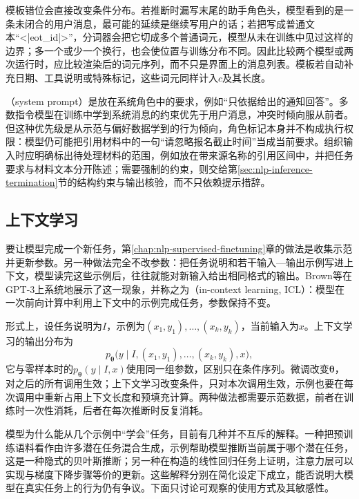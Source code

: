 模板错位会直接改变条件分布。若推断时漏写末尾的助手角色头，模型看到的是一条未闭合的用户消息，最可能的延续是继续写用户的话；若把写成普通文本“<|eot\_id|>”，分词器会把它切成多个普通词元，模型从未在训练中见过这样的边界；多一个或少一个换行，也会使位置与训练分布不同。因此比较两个模型或两次运行时，应比较渲染后的词元序列，而不只是界面上的消息列表。模板若自动补充日期、工具说明或特殊标记，这些词元同样计入$c$及其长度。

（system prompt）是放在系统角色中的要求，例如“只依据给出的通知回答”。多数指令模型在训练中学到系统消息的约束优先于用户消息，冲突时倾向服从前者。但这种优先级是从示范与偏好数据学到的行为倾向，角色标记本身并不构成执行权限：模型仍可能把引用材料中的一句“请忽略报名截止时间”当成当前要求。组织输入时应明确标出待处理材料的范围，例如放在带来源名称的引用区间中，并把任务要求与材料文本分开陈述；需要强制的约束，则交给第\ref{sec:nlp-inference-termination}节的结构约束与输出核验，而不只依赖提示措辞。

\subsection{上下文学习}
\label{sec:nlp-inference-demonstrations}

要让模型完成一个新任务，第\ref{chap:nlp-supervised-finetuning}章的做法是收集示范并更新参数。另一种做法完全不改参数：把任务说明和若干输入—输出示例写进上下文，模型读完这些示例后，往往就能对新输入给出相同格式的输出。Brown等在GPT-3上系统地展示了这一现象，并称之为（in-context learning, ICL）：模型在一次前向计算中利用上下文中的示例完成任务，参数保持不变。

形式上，设任务说明为$I$，示例为$(x_1,y_1),\ldots,(x_k,y_k)$，当前输入为$x$。上下文学习的输出分布为
\begin{equation}
 p_{\bm\theta}\bigl(y\mid I,(x_1,y_1),\ldots,(x_k,y_k),x\bigr),
 \label{eq:nlp-inference-icl}
\end{equation}
它与零样本时的$p_{\bm\theta}(y\mid I,x)$使用同一组参数，区别只在条件序列。微调改变$\bm\theta$，对之后的所有调用生效；上下文学习改变条件，只对本次调用生效，示例也要在每次调用中重新占用上下文长度和预填充计算。两种做法都需要示范数据，前者在训练时一次性消耗，后者在每次推断时反复消耗。

模型为什么能从几个示例中“学会”任务，目前有几种并不互斥的解释。一种把预训练语料看作由许多潜在任务混合生成，示例帮助模型推断当前属于哪个潜在任务，这是一种隐式的贝叶斯推断\cite{xie2022bayesianicl}；另一种在构造的线性回归任务上证明，注意力层可以实现与梯度下降步骤等价的更新。这些解释分别在简化设定下成立，能否说明大模型在真实任务上的行为仍有争议。下面只讨论可观察的使用方式及其敏感性。

